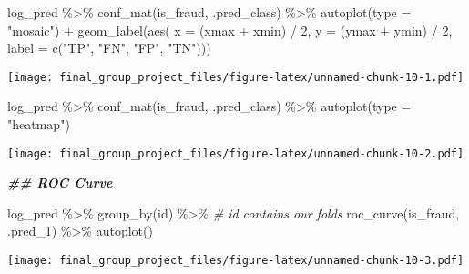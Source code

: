 \documentclass[
]{article}
\newenvironment{Shaded}{\begin{snugshade}}{\end{snugshade}}
\newcommand{\AttributeTok}[1]{\textcolor[rgb]{0.77,0.63,0.00}{#1}}
\newcommand{\CommentTok}[1]{\textcolor[rgb]{0.56,0.35,0.01}{\textit{#1}}}
\newcommand{\DecValTok}[1]{\textcolor[rgb]{0.00,0.00,0.81}{#1}}
\newcommand{\DocumentationTok}[1]{\textcolor[rgb]{0.56,0.35,0.01}{\textbf{\textit{#1}}}}
\newcommand{\FunctionTok}[1]{\textcolor[rgb]{0.00,0.00,0.00}{#1}}
\newcommand{\NormalTok}[1]{#1}
\newcommand{\SpecialCharTok}[1]{\textcolor[rgb]{0.00,0.00,0.00}{#1}}
\newcommand{\StringTok}[1]{\textcolor[rgb]{0.31,0.60,0.02}{#1}}
\begin{document}
\begin{Shaded}
\begin{Highlighting}[]
\NormalTok{log\_pred }\SpecialCharTok{\%\textgreater{}\%} 
  \FunctionTok{conf\_mat}\NormalTok{(is\_fraud, .pred\_class) }\SpecialCharTok{\%\textgreater{}\%} 
  \FunctionTok{autoplot}\NormalTok{(}\AttributeTok{type =} \StringTok{"mosaic"}\NormalTok{) }\SpecialCharTok{+}
  \FunctionTok{geom\_label}\NormalTok{(}\FunctionTok{aes}\NormalTok{(}
      \AttributeTok{x =}\NormalTok{ (xmax }\SpecialCharTok{+}\NormalTok{ xmin) }\SpecialCharTok{/} \DecValTok{2}\NormalTok{, }
      \AttributeTok{y =}\NormalTok{ (ymax }\SpecialCharTok{+}\NormalTok{ ymin) }\SpecialCharTok{/} \DecValTok{2}\NormalTok{, }
      \AttributeTok{label =} \FunctionTok{c}\NormalTok{(}\StringTok{"TP"}\NormalTok{, }\StringTok{"FN"}\NormalTok{, }\StringTok{"FP"}\NormalTok{, }\StringTok{"TN"}\NormalTok{)))}
\end{Highlighting}
\end{Shaded}

\texttt{[image: final\_group\_project\_files/figure-latex/unnamed-chunk-10-1.pdf]}

\begin{Shaded}
\begin{Highlighting}[]
\NormalTok{log\_pred }\SpecialCharTok{\%\textgreater{}\%} 
  \FunctionTok{conf\_mat}\NormalTok{(is\_fraud, .pred\_class) }\SpecialCharTok{\%\textgreater{}\%} 
  \FunctionTok{autoplot}\NormalTok{(}\AttributeTok{type =} \StringTok{"heatmap"}\NormalTok{)}
\end{Highlighting}
\end{Shaded}

\texttt{[image: final\_group\_project\_files/figure-latex/unnamed-chunk-10-2.pdf]}

\begin{Shaded}
\begin{Highlighting}[]
\DocumentationTok{\#\# ROC Curve}

\NormalTok{log\_pred }\SpecialCharTok{\%\textgreater{}\%} 
  \FunctionTok{group\_by}\NormalTok{(id) }\SpecialCharTok{\%\textgreater{}\%} \CommentTok{\# id contains our folds}
  \FunctionTok{roc\_curve}\NormalTok{(is\_fraud, .pred\_1) }\SpecialCharTok{\%\textgreater{}\%} 
  \FunctionTok{autoplot}\NormalTok{()}
\end{Highlighting}
\end{Shaded}

\texttt{[image: final\_group\_project\_files/figure-latex/unnamed-chunk-10-3.pdf]}
\end{document}
